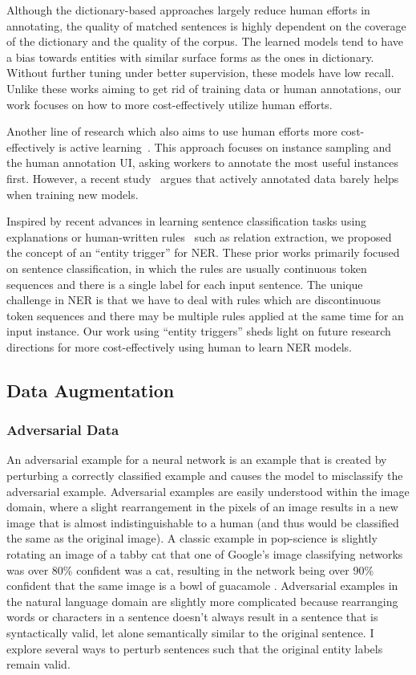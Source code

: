 Although the dictionary-based approaches largely reduce human efforts in annotating, the quality of matched sentences is highly dependent on the coverage of the dictionary and the quality of the corpus.
The learned models tend to have a bias towards entities with similar surface forms as the ones in dictionary. Without further tuning under better supervision, these models have low recall.
Unlike these works aiming to get rid of training data or human annotations, our work focuses on how to more cost-effectively utilize human efforts.

Another line of research which also aims to use human efforts more cost-effectively is active learning~\citep{shen2018deep,Lin2019AlpacaTagAA}.
This approach focuses on instance sampling and the human annotation UI, asking workers to annotate the most useful instances first.
However, a recent study~\citep{Lipton2018PracticalOT} argues that actively annotated data barely helps when training new models. 

Inspired by recent advances in learning sentence classification tasks using explanations or human-written rules~\citep{Li2018GeneralizeSK, Hancock2018TrainingCW, Wang2020Learning, Zhou2019NEROAN} such as relation extraction, we proposed the concept of an ``entity trigger'' for NER.
These prior works primarily focused on sentence classification, in which the rules are usually continuous token sequences and there is a single label for each input sentence.
The unique challenge in NER is that we have to deal with rules which are discontinuous token sequences and there may be multiple rules applied at the same time for an input instance. Our work using ``entity triggers'' sheds light on future research directions for more cost-effectively using human to learn NER models.




\subsection{Data Augmentation}
\subsubsection{Adversarial Data}
An adversarial example for a neural network is an example that is created by perturbing a correctly classified example and causes the model to misclassify the  adversarial example. Adversarial examples are easily understood within the image domain, where a slight rearrangement in the pixels of an image results in a new image that is almost indistinguishable to a human (and thus would be classified the same as the original image). A classic example in pop-science is slightly rotating an image of a tabby cat that one of Google's image classifying networks was over 80\% confident was a cat, resulting in the network being over 90\% confident that the same image is a bowl of guacamole \citep{guacamole}. Adversarial examples in the natural language domain are slightly more complicated because rearranging words or characters in a sentence doesn't always result in a sentence that is syntactically valid, let alone semantically similar to the original sentence. I explore several ways to perturb sentences such that the original entity labels remain valid.

